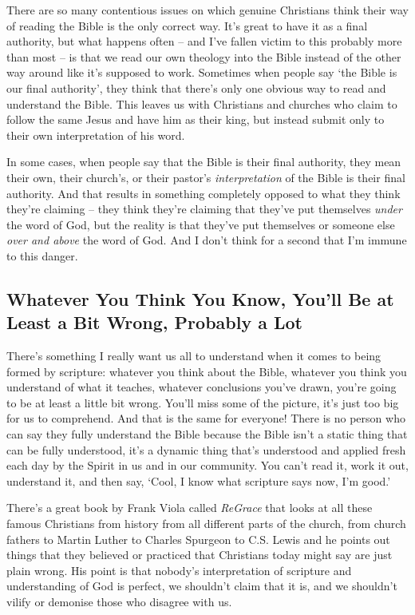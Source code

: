 There are so many contentious issues on which genuine Christians think their way
of reading the Bible is the only correct way. It's great to have it as a final
authority, but what happens often -- and I've fallen victim to this probably
more than most -- is that we read our own theology into the Bible instead of the
other way around like it's supposed to work. Sometimes when people say `the
Bible is our final authority', they think that there's only one obvious way to
read and understand the Bible. This leaves us with Christians and churches who
claim to follow the same Jesus and have him as their king, but instead submit
only to their own interpretation of his word.

In some cases, when people say that the Bible is their final authority, they
mean their own, their church's, or their pastor's \textit{interpretation} of the
Bible is their final authority. And that results in something completely opposed
to what they think they're claiming -- they think they're claiming that they've
put themselves \textit{under} the word of God, but the reality is that they've
put themselves or someone else \textit{over and above} the word of God. And I
don't think for a second that I'm immune to this danger.

\subsection{Whatever You Think You Know, You'll Be at Least a Bit Wrong,
Probably a Lot}

There's something I really want us all to understand when it comes to being
formed by scripture: whatever you think about the Bible, whatever you think you
understand of what it teaches, whatever conclusions you've drawn, you're going
to be at least a little bit wrong. You'll miss some of the picture, it's just
too big for us to comprehend. And that is the same for everyone! There is no
person who can say they fully understand the Bible because the Bible isn't a
static thing that can be fully understood, it's a dynamic thing that's
understood and applied fresh each day by the Spirit in us and in our community.
You can't read it, work it out, understand it, and then say, `Cool, I know what
scripture says now, I'm good.'

There's a great book by Frank Viola called \textit{ReGrace} that looks at all
these famous Christians from history from all different parts of the church,
from church fathers to Martin Luther to Charles Spurgeon to C.S. Lewis and he
points out things that they believed or practiced that Christians today might
say are just plain wrong. His point is that nobody's interpretation of scripture
and understanding of God is perfect, we shouldn't claim that it is, and we
shouldn't vilify or demonise those who disagree with us.

